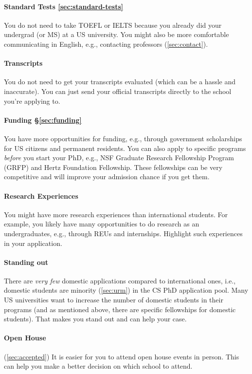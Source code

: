 \documentclass[oneside,11pt]{book}
\begin{document}
\paragraph{Standard Tests \autoref{sec:standard-tests}} You do not need to take TOEFL or IELTS because you already did your undergrad (or MS) at a US university.  You might also be more comfortable communicating in English, e.g., contacting professors (\autoref{sec:contact}).

\paragraph{Transcripts} You do not need to get your transcripts evaluated (which can be a hassle and inaccurate).  You can just send your official transcripts directly to the school you're applying to.

\paragraph{Funding \S\ref{sec:funding}} You have more opportunities for funding, e.g., through government scholarships for US citizens and permanent residents.  You can also apply to specific programs \emph{before} you start your PhD, e.g., NSF Graduate Research Fellowship Program (GRFP) and Hertz Foundation Fellowship.  These fellowships can be very competitive and will improve your admission chance if you get them.

\paragraph{Research Experiences} You might have more research experiences than international students. For example, you likely have many opportunities to do research as an undergraduates, e.g., through REUs and internships.  Highlight such experiences in your application.

\paragraph{Standing out} There are \emph{very few} domestic applications compared to international ones, i.e., domestic students are minority (\autoref{sec:urm}) in the CS PhD application pool. Many US universities want to increase the number of domestic students in their programs (and as mentioned above, there are specific fellowships for domestic students).
That makes you stand out and can help your case.

\paragraph{Open House} (\autoref{sec:accepted}) It is easier for you to attend open house events in person.  This can help you make a better decision on which school to attend.
\end{document}
